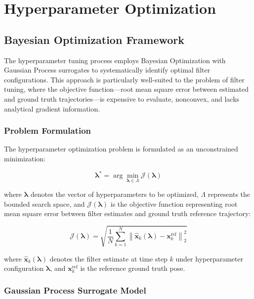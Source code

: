 \documentclass[conference]{IEEEtran}
\begin{document}
\section{Hyperparameter Optimization} \label{sec:hyperparameter_optimization}

\subsection{Bayesian Optimization Framework} \label{sec:bayesian_optimization_framework}

The hyperparameter tuning process employs Bayesian Optimization with Gaussian Process surrogates to systematically identify optimal filter configurations. This approach is particularly well-suited to the problem of filter tuning, where the objective function—root mean square error between estimated and ground truth trajectories—is expensive to evaluate, nonconvex, and lacks analytical gradient information.

\subsubsection{Problem Formulation}

The hyperparameter optimization problem is formulated as an unconstrained minimization:

\begin{equation}
    \boldsymbol{\lambda}^* = \arg\min_{\boldsymbol{\lambda} \in \Lambda} \mathcal{J}(\boldsymbol{\lambda})
\end{equation}

where $\boldsymbol{\lambda}$ denotes the vector of hyperparameters to be optimized, $\Lambda$ represents the bounded search space, and $\mathcal{J}(\boldsymbol{\lambda})$ is the objective function representing root mean square error between filter estimates and ground truth reference trajectory:

\begin{equation}
    \mathcal{J}(\boldsymbol{\lambda}) = \sqrt{\frac{1}{N} \sum_{k=1}^{N} \left\| \hat{\mathbf{x}}_k(\boldsymbol{\lambda}) - \mathbf{x}_k^{\text{ref}} \right\|_2^2}
\end{equation}

where $\hat{\mathbf{x}}_k(\boldsymbol{\lambda})$ denotes the filter estimate at time step $k$ under hyperparameter configuration $\boldsymbol{\lambda}$, and $\mathbf{x}_k^{\text{ref}}$ is the reference ground truth pose.

\subsubsection{Gaussian Process Surrogate Model}
\end{document}
